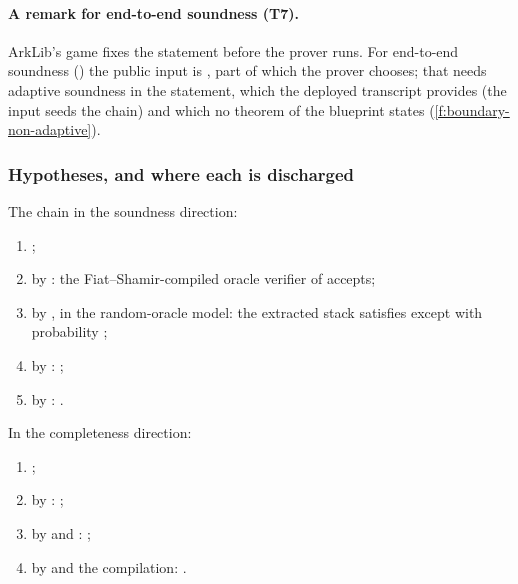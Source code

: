 \paragraph{A remark for end-to-end soundness (T7).} ArkLib's game fixes the statement before the
prover runs. For end-to-end soundness () the public input is
, part of which the prover
chooses; that needs adaptive soundness in the statement, which the deployed transcript provides
(the input seeds the chain) and which no theorem of the blueprint states
(\cref{f:boundary-non-adaptive}).

\subsubsection{Hypotheses, and where each is discharged}\label{sec:gen-boundary-hypotheses}

\begin{sloppypar}
The chain in the soundness direction:
\begin{enumerate}
\item {};
\item by :  the Fiat--Shamir-compiled
  oracle verifier of  accepts;
\item by , in the random-oracle model: the extracted stack 
  satisfies  except with probability
  ;
\item by : ;
\item by :
  .
\end{enumerate}
In the completeness direction:
\begin{enumerate}
\item {};
\item by : ;
\item by  and :
  ;
\item by  and the compilation:
  .
\end{enumerate}
\end{sloppypar}

